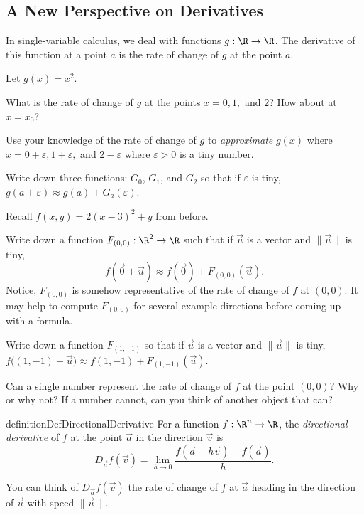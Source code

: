 \subsection*{A New Perspective on Derivatives}

	In single-variable calculus, we deal with functions $g:\R\to\R$.  The derivative of this function
	at a point $a$ is the rate of change of $g$ at the point $a$.

\begin{question}
	Let $g(x)=x^2$.
	\begin{parts}
		\item What is the rate of change of $g$ at the points $x=0,1,$ and $2$?  How about at $x=x_0$?
		\item Use your knowledge of the rate of change of $g$ to \emph{approximate} $g(x)$ where
			$x=0+\varepsilon, 1+\varepsilon,$ and $2-\varepsilon$ where $\varepsilon>0$ is a tiny number.
		\item Write down three functions: $G_0$, $G_1$, and $G_2$ so that if $\varepsilon$ is tiny, $g(a+\varepsilon)\approx
			g(a) + G_a(\varepsilon)$.  
	\end{parts}
\end{question}

\begin{question}
	Recall $f(x,y)=2(x-3)^2+y$ from before.
	\begin{parts}
		\item Write down a function $F_{(0,0)}:\R^2\to\R$ such that if $\vec u$ is a vector
			and $\|\vec u\|$ is tiny, 
			\[
				f(\vec 0+\vec u)\approx f(\vec 0) + F_{(0,0)}(\vec u).
			\]
			Notice, $F_{(0,0)}$ is somehow representative of the rate of change of $f$ at $(0,0)$.
			It may help to compute $F_{(0,0)}$ for several example directions before coming up
			with a formula.
		\item Write down a function $F_{(1,-1)}$ so that if $\vec u$ is a vector and $\|\vec u\|$ is
			tiny, $f\Big((1,-1)+\vec u\Big)\approx f(1,-1)+F_{(1,-1)}(\vec u)$.
		\item Can a single number represent the rate of change of $f$ at the point $(0,0)$?  Why or why not?
			If a number cannot, can you think of another object that can?
	\end{parts}
\end{question}

\begin{restatable*}{definition}{DefDirectionalDerivative}
	For a function $f:\R^n\to\R$, the \emph{directional derivative} of $f$ at the point $\vec a$
	in the direction $\vec v$ is
	\[
		D_{\vec a}f(\vec v) = \lim_{h\to0}\frac{f(\vec a+h\vec v)-f(\vec a)}{h}.
	\]
\end{restatable*}
		You can think of $D_{\vec a}f(\vec v)$ the rate of change of $f$ at 
		$\vec a$ heading in the direction of $\vec u$
		with speed $\|\vec u\|$.

